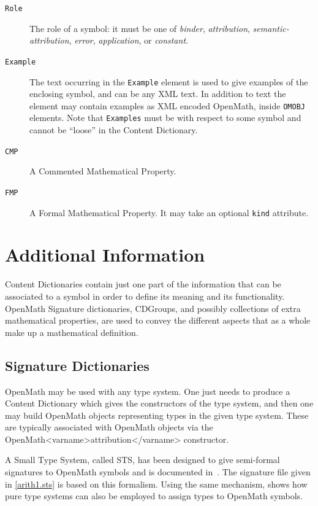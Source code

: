 \documentclass{report}
\def\textquote#1{``#1''}
\def\OM{OpenMath\xspace}
\def\XML{XML\xspace}
\begin{document}
\begin{description}
\item[\lstinline|Role|] The role of a symbol: it must be one of \emph{binder},
  \emph{attribution}, \emph{semantic-attribution}, \emph{error}, \emph{application}, or
  \emph{constant}.
\item[\lstinline|Example|] The text occurring in the \lstinline|Example| element is used
  to give examples of the enclosing symbol, and can be any \XML text. In addition to text
  the element may contain examples as \XML encoded \OM, inside \lstinline|OMOBJ|
  elements.  Note that \lstinline|Examples| must be with respect to some symbol and
  cannot be \textquote{loose} in the Content Dictionary.
\item[\lstinline|CMP|] A Commented Mathematical Property.
\item[\lstinline|FMP|] A Formal Mathematical Property.  It may take an optional
  \lstinline|kind| attribute.
\end{description}

\section{Additional Information}\label{addfiles}

Content Dictionaries contain just one part of the information that can be associated to a
symbol in order to define its meaning and its functionality. \OM Signature dictionaries,
CDGroups, and possibly collections of extra mathematical properties, are used to convey
the different aspects that as a whole make up a mathematical definition.

\subsection{Signature Dictionaries}\label{sigfiles}

\OM may be used with any type system. One just needs to produce a Content Dictionary which
gives the constructors of the type system, and then one may build \OM objects representing
types in the given type system. These are typically associated with \OM objects via the
\OM <varname>attribution</varname> constructor.

A Small Type System, called STS, has been designed to give semi-formal signatures to \OM
symbols and is documented in~\cite{OM_D132c}.  The signature file given in
\ref{arith1.sts} is based on this formalism. Using the same mechanism, \cite{OMD132b}
shows how pure type systems can also be employed to assign types to \OM symbols.
\end{document}

